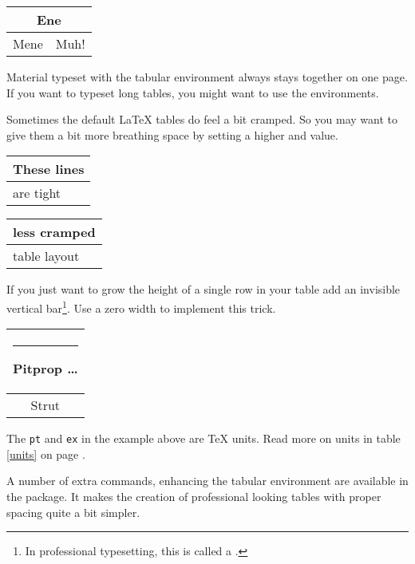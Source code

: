 \begin{example}
\begin{tabular}{|c|c|}
\hline
\multicolumn{2}{|c|}{Ene} \\
\hline
Mene & Muh! \\
\hline
\end{tabular}
\end{example}

Material typeset with the tabular environment always stays together on one
page. If you want to typeset long tables, you might want to use the
 environments.

Sometimes the default \LaTeX{} tables do feel a bit cramped. So you may want
to give them a bit more breathing space by setting a higher
 and  value.

\begin{example}
\begin{tabular}{|l|}
\hline
These lines\\\hline
are tight\\\hline
\end{tabular}

{\renewcommand{\arraystretch}{1.5}
\renewcommand{\tabcolsep}{0.2cm}
\begin{tabular}{|l|}
\hline
less cramped\\\hline
table layout\\\hline
\end{tabular}}

\end{example}

If you just want to grow the height of a single row in your table add an invisible vertical bar\footnote{In professional typesetting,
this is called a .}. Use a zero width  to implement this trick.

\begin{example}
\begin{tabular}{|c|}
\hline
\rule{1pt}{4ex}Pitprop \ldots\\
\hline
\rule{0pt}{4ex}Strut\\
\hline
\end{tabular}
\end{example}

The \texttt{pt} and \texttt{ex} in the example above are \TeX{} units. Read more
on units in table \ref{units} on page \pageref{units}.

A number of extra commands, enhancing the tabular environment are available
in the  package. It makes the creation of professional looking
tables with proper spacing quite a bit simpler.



